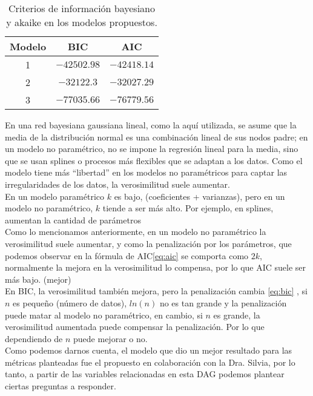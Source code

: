 \documentclass[12pt, letterpaper]{report}
\begin{document}
\begin{table}[H]
    \centering
    \begin{tabular}{|c|c|c|}
        \hline
        Modelo & BIC & AIC \\
        \hline
        1 & $-42502.98$ & $-42418.14$ \\
        \hline
        2 & $-32122.3$ & $-32027.29$ \\
        \hline
        3 & $-77035.66$ & $-76779.56$ \\
        \hline
    \end{tabular}
    \caption{Criterios de información bayesiano y akaike en los modelos propuestos.}
    \label{tab:scores}
\end{table}


En una red bayesiana gaussiana lineal, como la aquí utilizada, se asume que la media de la distribución normal es una combinación lineal de sus nodos padre; en un modelo no paramétrico, no se impone la regresión lineal para la media, sino que se usan splines o procesos más flexibles que se adaptan a los datos. Como el modelo tiene más “libertad” en los modelos no paramétricos para captar las irregularidades de los datos, la verosimilitud suele aumentar.\\

En un modelo paramétrico $k$ es bajo, (coeficientes + varianzas), pero en un modelo no paramétrico, $k$ tiende a ser más alto. Por ejemplo, en splines, aumentan la cantidad de parámetros\\

Como lo mencionamos anteriormente, en un modelo no paramétrico la verosimilitud suele aumentar, y como la penalización por los parámetros, que podemos observar en la fórmula de AIC\ref{eq:aic} se comporta como $2k$, normalmente la mejora en la verosimilitud lo compensa, por lo que AIC suele ser más bajo. (mejor)\\

En BIC, la verosimilitud también mejora, pero la penalización cambia \ref{eq:bic} , si $n$ es pequeño (número de datos), $ln(n)$ no es tan grande y la penalización puede matar al modelo no paramétrico, en cambio, si $n$ es grande, la verosimilitud aumentada puede compensar la penalización. Por lo que dependiendo de $n$ puede mejorar o no.\\

Como podemos darnos cuenta, el modelo que dio un mejor resultado para las métricas planteadas fue el propuesto en colaboración con la Dra. Silvia, por lo tanto, a partir de las variables relacionadas en esta DAG podemos plantear ciertas preguntas a responder.
\\
\end{document}
